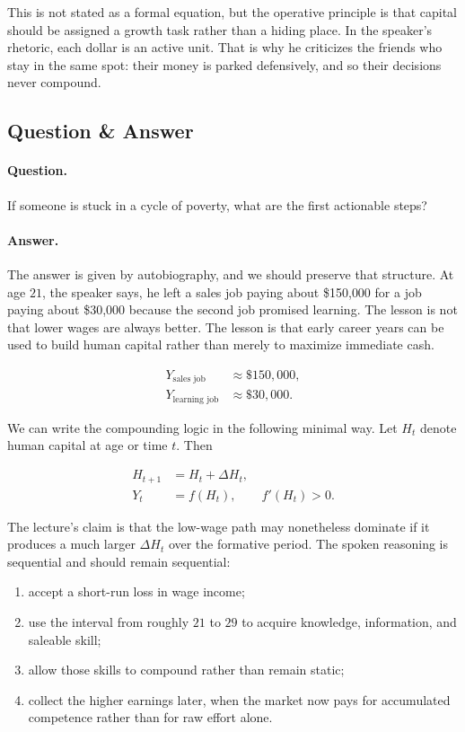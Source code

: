 This is not stated as a formal equation, but the operative principle is that capital should be assigned a growth task rather than a hiding place. In the speaker's rhetoric, each dollar is an active unit. That is why he criticizes the friends who stay in the same spot: their money is parked defensively, and so their decisions never compound.

\subsection{Question \& Answer}

\paragraph{Question.} If someone is stuck in a cycle of poverty, what are the first actionable steps?

\paragraph{Answer.} The answer is given by autobiography, and we should preserve that structure. At age \(21\), the speaker says, he left a sales job paying about \$150{,}000 for a job paying about \$30{,}000 because the second job promised learning. The lesson is not that lower wages are always better. The lesson is that early career years can be used to build human capital rather than merely to maximize immediate cash.

\begin{align}
Y_{\text{sales job}} &\approx \$150{,}000, \\
Y_{\text{learning job}} &\approx \$30{,}000.
\end{align}

We can write the compounding logic in the following minimal way. Let \(H_t\) denote human capital at age or time \(t\). Then

\begin{align}
H_{t+1} &= H_t+\Delta H_t, \\
Y_t &= f(H_t), \qquad f'(H_t)>0.
\end{align}

The lecture's claim is that the low-wage path may nonetheless dominate if it produces a much larger \(\Delta H_t\) over the formative period. The spoken reasoning is sequential and should remain sequential:

\begin{enumerate}
\item accept a short-run loss in wage income;
\item use the interval from roughly \(21\) to \(29\) to acquire knowledge, information, and saleable skill;
\item allow those skills to compound rather than remain static;
\item collect the higher earnings later, when the market now pays for accumulated competence rather than for raw effort alone.
\end{enumerate}

